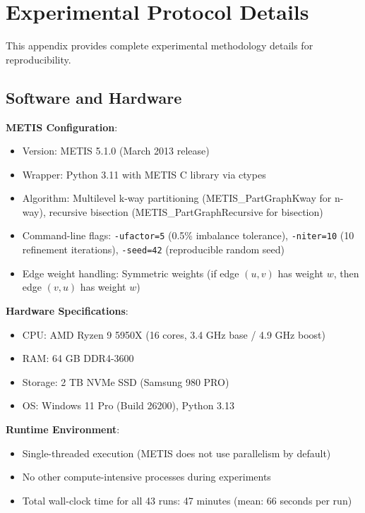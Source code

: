 \section{Experimental Protocol Details}
\label{app:experimental-protocol}

This appendix provides complete experimental methodology details for reproducibility.

\subsection{Software and Hardware}

\textbf{METIS Configuration}:
\begin{itemize}
    \item Version: METIS 5.1.0 (March 2013 release)
    \item Wrapper: Python 3.11 with METIS C library via ctypes
    \item Algorithm: Multilevel k-way partitioning (METIS\_PartGraphKway for n-way), recursive bisection (METIS\_PartGraphRecursive for bisection)
    \item Command-line flags: \texttt{-ufactor=5} (0.5\% imbalance tolerance), \texttt{-niter=10} (10 refinement iterations), \texttt{-seed=42} (reproducible random seed)
    \item Edge weight handling: Symmetric weights (if edge $(u,v)$ has weight $w$, then edge $(v,u)$ has weight $w$)
\end{itemize}

\textbf{Hardware Specifications}:
\begin{itemize}
    \item CPU: AMD Ryzen 9 5950X (16 cores, 3.4 GHz base / 4.9 GHz boost)
    \item RAM: 64 GB DDR4-3600
    \item Storage: 2 TB NVMe SSD (Samsung 980 PRO)
    \item OS: Windows 11 Pro (Build 26200), Python 3.13
\end{itemize}

\textbf{Runtime Environment}:
\begin{itemize}
    \item Single-threaded execution (METIS does not use parallelism by default)
    \item No other compute-intensive processes during experiments
    \item Total wall-clock time for all 43 runs: 47 minutes (mean: 66 seconds per run)
\end{itemize}

